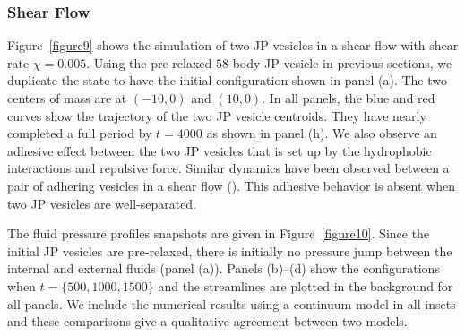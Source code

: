 \documentclass[lineno]{jfm}
\begin{document}
\subsubsection{Shear Flow}

Figure~\ref{figure9} shows the simulation of two JP vesicles in a
shear flow with shear rate $\chi=0.005$. Using the pre-relaxed $58$-body
JP vesicle in previous sections, we duplicate the state to have the
initial configuration shown in panel (a). The two centers of mass are at
$(-10,0)$ and $(10,0)$. In all panels, the blue and red curves show the
trajectory of the two JP vesicle centroids. They have nearly
completed a full period by $t=4000$ as shown in panel (h). We also
observe an adhesive effect between the two JP vesicles that is set up
by the hydrophobic interactions and repulsive force. Similar dynamics
have been observed between a pair of adhering vesicles in a shear flow
(\cite{qua-vee-you2019, abb-far-ezz-ben-mis2021}). This adhesive
behavior is absent when two JP vesicles are well-separated.

The fluid pressure profiles snapshots are given in
Figure~\ref{figure10}. Since the initial JP vesicles are pre-relaxed,
there is initially no pressure jump between the internal and external
fluids (panel (a)). Panels (b)--(d) show the configurations when $t =
\{500,1000,1500\}$ and the streamlines are plotted in the background for
all panels. We include the numerical results using a continuum model in
all insets and these comparisons give a qualitative agreement between
two models.
\end{document}
